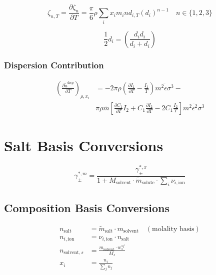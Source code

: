 \documentclass[12pt, letterpaper]{article}
\begin{document}
\begin{equation}
\zeta_{n,T}=\frac{\partial\zeta_{n}}{\partial T}=\frac{\pi}{6}\rho\sum_{i}x_{i}m_{i}nd_{i,T}\left(d_{i}\right)^{n-1}\quad n\in\{1,2,3\}
\end{equation}

\begin{equation}
\frac{1}{2}d_i=\left(\frac{d_id_i}{d_i+d_i}\right)
\end{equation}

\subsubsection{Dispersion Contribution}

\begin{equation}
\begin{aligned}
\left(\frac{\partial\tilde{a}^{\mathrm{disp}}}{\partial T}\right)_{\rho,x_{i}}&=-2\pi\rho\left(\frac{\partial I_{1}}{\partial T}-\frac{I_{1}}{T}\right)\overline{m^{2}\epsilon\sigma^{3}}-\\&\pi\rho\bar{m}\left[\frac{\partial C_{1}}{\partial T}I_{2}+C_{1}\frac{\partial I_{2}}{\partial T}-2C_{1}\frac{I_{2}}{T}\right]\overline{m^{2}\epsilon^{2}\sigma^{3}}
\end{aligned}
\end{equation}

\section{Salt Basis Conversions}

\begin{equation}
\gamma_{\pm}^{*,m}=\frac{\gamma_{\pm}^{*,x}}{1+M_{\mathrm{solvent}}\cdot\tilde{m}_{\mathrm{solute}}\cdot\sum_{i}\nu_{i,\mathrm{ion}}}\end{equation}

\subsection{Composition Basis Conversions}

\begin{align}
n_{\mathrm{salt}} &= \tilde{m}_{\mathrm{salt}} \cdot m_{\mathrm{solvent}} \quad (\text{molality basis}) \\
n_{i,\mathrm{ion}} &= \nu_{i,\mathrm{ion}} \cdot n_{\mathrm{salt}} \\
n_{\mathrm{solvent},s} &= \frac{m_{\mathrm{solvent}} \cdot w_{s}^{sf}}{M_s} \\
x_i &= \frac{n_i}{\sum_j n_j}
\end{align}
\end{document}
